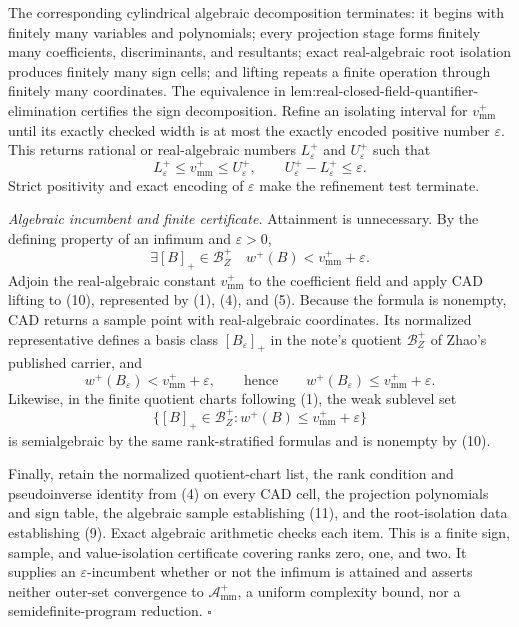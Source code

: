 The corresponding cylindrical algebraic decomposition terminates: it begins with finitely many variables and polynomials; every projection stage forms finitely many coefficients, discriminants, and resultants; exact real-algebraic root isolation produces finitely many sign cells; and lifting repeats a finite operation through finitely many coordinates.  The equivalence in lem:real-closed-field-quantifier-elimination certifies the sign decomposition.  Refine an isolating interval for \(v_{\mathrm{mm}}^+\) until its exactly checked width is at most the exactly encoded positive number \(\varepsilon\).  This returns rational or real-algebraic numbers \(L_\varepsilon^+\) and \(U_\varepsilon^+\) such that
\[
L_\varepsilon^+\le v_{\mathrm{mm}}^+\le U_\varepsilon^+,
\qquad
U_\varepsilon^+-L_\varepsilon^+\le\varepsilon.
\tag{9}
\]
Strict positivity and exact encoding of \(\varepsilon\) make the refinement test terminate.

\emph{Algebraic incumbent and finite certificate.}
Attainment is unnecessary.  By the defining property of an infimum and \(\varepsilon>0\),
\[
\exists [B]_+\in\mathcal B_Z^+
\quad
w^+(B)<v_{\mathrm{mm}}^++\varepsilon.
\tag{10}
\]
Adjoin the real-algebraic constant \(v_{\mathrm{mm}}^+\) to the coefficient field and apply CAD lifting to (10), represented by (1), (4), and (5).  Because the formula is nonempty, CAD returns a sample point with real-algebraic coordinates.  Its normalized representative defines a basis class \([B_\varepsilon]_+\) in the note's quotient \(\mathcal B_Z^+\) of Zhao's published carrier, and
\[
w^+(B_\varepsilon)<v_{\mathrm{mm}}^++\varepsilon,
\qquad\text{hence}\qquad
w^+(B_\varepsilon)\le v_{\mathrm{mm}}^++\varepsilon.
\tag{11}
\]
Likewise, in the finite quotient charts following (1), the weak sublevel set
\[
\{[B]_+\in\mathcal B_Z^+:w^+(B)\le v_{\mathrm{mm}}^++\varepsilon\}
\]
is semialgebraic by the same rank-stratified formulas and is nonempty by (10).

Finally, retain the normalized quotient-chart list, the rank condition and pseudoinverse identity from (4) on every CAD cell, the projection polynomials and sign table, the algebraic sample establishing (11), and the root-isolation data establishing (9).  Exact algebraic arithmetic checks each item.  This is a finite sign, sample, and value-isolation certificate covering ranks zero, one, and two.  It supplies an \(\varepsilon\)-incumbent whether or not the infimum is attained and asserts neither outer-set convergence to \(\mathcal A_{\mathrm{mm}}^+\), a uniform complexity bound, nor a semidefinite-program reduction.  \(\square\)